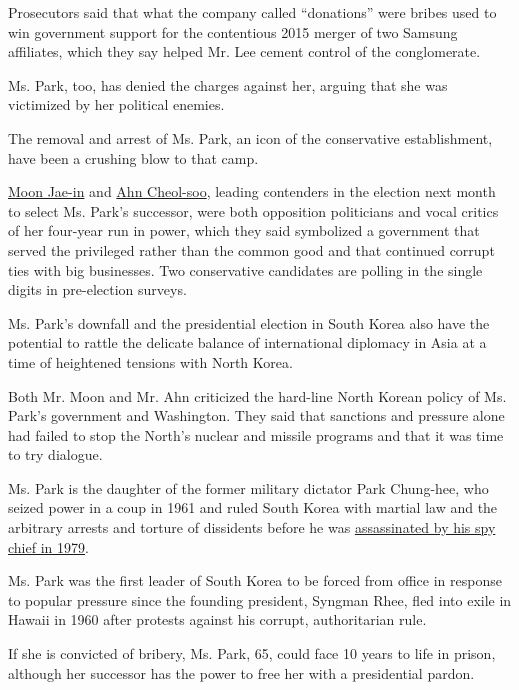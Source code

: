 Prosecutors said that what the company called ``donations'' were bribes
used to win government support for the contentious 2015 merger of two
Samsung affiliates, which they say helped Mr. Lee cement control of the
conglomerate.

Ms. Park, too, has denied the charges against her, arguing that she was
victimized by her political enemies.

The removal and arrest of Ms. Park, an icon of the conservative
establishment, have been a crushing blow to that camp.

\href{https://www.nytimes3xbfgragh.onion/2017/03/10/world/asia/south-korea-liberals-impeachment.html}{Moon
Jae-in} and
\href{https://www.nytimes3xbfgragh.onion/2017/04/14/world/asia/south-korea-election-ahn-cheol-soo.html}{Ahn
Cheol-soo}, leading contenders in the election next month to select Ms.
Park's successor, were both opposition politicians and vocal critics of
her four-year run in power, which they said symbolized a government that
served the privileged rather than the common good and that continued
corrupt ties with big businesses. Two conservative candidates are
polling in the single digits in pre-election surveys.

Ms. Park's downfall and the presidential election in South Korea also
have the potential to rattle the delicate balance of international
diplomacy in Asia at a time of heightened tensions with North Korea.

Both Mr. Moon and Mr. Ahn criticized the hard-line North Korean policy
of Ms. Park's government and Washington. They said that sanctions and
pressure alone had failed to stop the North's nuclear and missile
programs and that it was time to try dialogue.

Ms. Park is the daughter of the former military dictator Park Chung-hee,
who seized power in a coup in 1961 and ruled South Korea with martial
law and the arbitrary arrests and torture of dissidents before he was
\href{http://www.nytimes3xbfgragh.onion/1979/10/27/archives/president-park-is-slain-in-korea-by-intelligence-chief-seoul-says.html}{assassinated
by his spy chief in 1979}.

Ms. Park was the first leader of South Korea to be forced from office in
response to popular pressure since the founding president, Syngman Rhee,
fled into exile in Hawaii in 1960 after protests against his corrupt,
authoritarian rule.

If she is convicted of bribery, Ms. Park, 65, could face 10 years to
life in prison, although her successor has the power to free her with a
presidential pardon.

